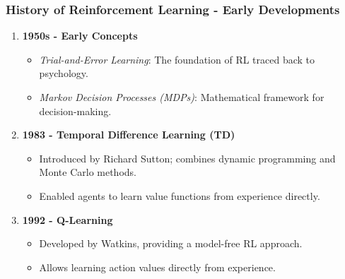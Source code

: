 \documentclass{beamer}
\begin{document}
\begin{frame}[fragile]
    \frametitle{History of Reinforcement Learning - Early Developments}
    \begin{enumerate}
        \item \textbf{1950s - Early Concepts}
        \begin{itemize}
            \item \textit{Trial-and-Error Learning}: The foundation of RL traced back to psychology.
            \item \textit{Markov Decision Processes (MDPs)}: Mathematical framework for decision-making.
        \end{itemize}
        
        \item \textbf{1983 - Temporal Difference Learning (TD)}
        \begin{itemize}
            \item Introduced by Richard Sutton; combines dynamic programming and Monte Carlo methods.
            \item Enabled agents to learn value functions from experience directly.
        \end{itemize}
        
        \item \textbf{1992 - Q-Learning}
        \begin{itemize}
            \item Developed by Watkins, providing a model-free RL approach.
            \item Allows learning action values directly from experience.
        \end{itemize}
    \end{enumerate}
\end{frame}
\end{document}
